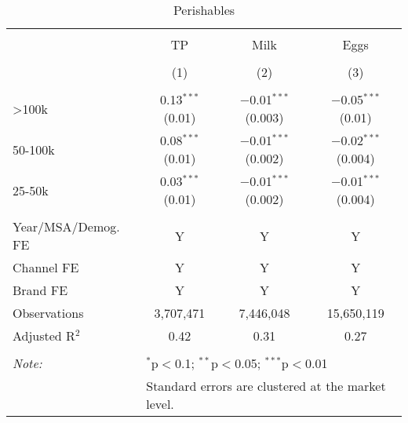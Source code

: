 
\begin{table}[!htbp] \centering 
  \caption{Perishables} 
  \label{tab:packageSizeFullPerishable} 
\begin{tabular}{@{\extracolsep{5pt}}lccc} 
\\[-1.8ex]\hline 
\hline \\[-1.8ex] 
 & TP & Milk & Eggs \\ 
\\[-1.8ex] & (1) & (2) & (3)\\ 
\hline \\[-1.8ex] 
 >100k & 0.13$^{***}$ (0.01) & $-$0.01$^{***}$ (0.003) & $-$0.05$^{***}$ (0.01) \\ 
  50-100k & 0.08$^{***}$ (0.01) & $-$0.01$^{***}$ (0.002) & $-$0.02$^{***}$ (0.004) \\ 
  25-50k & 0.03$^{***}$ (0.01) & $-$0.01$^{***}$ (0.002) & $-$0.01$^{***}$ (0.004) \\ 
 \hline \\[-1.8ex] 
Year/MSA/Demog. FE & Y & Y & Y \\ 
Channel FE & Y & Y & Y \\ 
Brand FE & Y & Y & Y \\ 
Observations & 3,707,471 & 7,446,048 & 15,650,119 \\ 
Adjusted R$^{2}$ & 0.42 & 0.31 & 0.27 \\ 
\hline 
\hline \\[-1.8ex] 
\textit{Note:}  & \multicolumn{3}{l}{$^{*}$p$<$0.1; $^{**}$p$<$0.05; $^{***}$p$<$0.01} \\ 
 & \multicolumn{3}{l}{Standard errors are clustered at the market level.} \\ 
\end{tabular} 
\end{table} 
